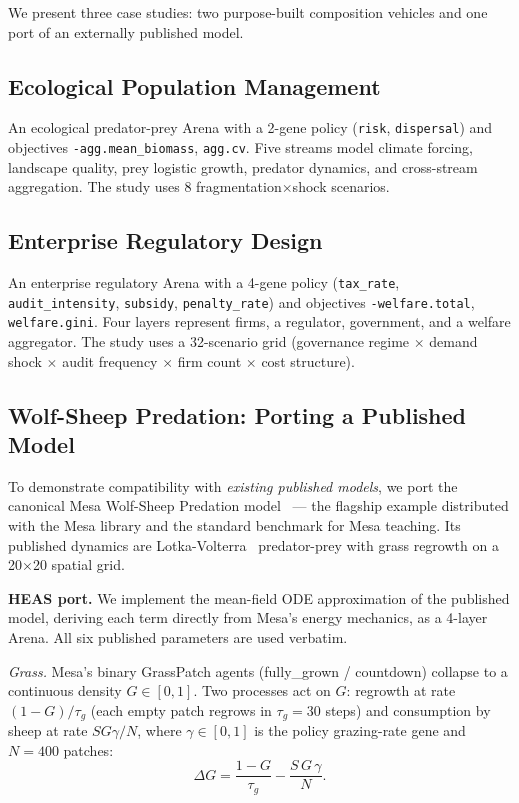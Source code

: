 \documentclass{wscpaperproc}
\begin{document}
We present three case studies: two purpose-built composition vehicles and
one port of an externally published model.

\subsection{Ecological Population Management}

An ecological predator-prey Arena with a 2-gene policy (\texttt{risk},
\texttt{dispersal}) and objectives \texttt{-agg.mean\_biomass},
\texttt{agg.cv}. Five streams model climate forcing, landscape quality, prey
logistic growth, predator dynamics, and cross-stream aggregation. The study
uses 8 fragmentation$\times$shock scenarios.

\subsection{Enterprise Regulatory Design}

An enterprise regulatory Arena with a 4-gene policy
(\texttt{tax\_rate}, \texttt{audit\_intensity}, \texttt{subsidy},
\texttt{penalty\_rate}) and objectives \texttt{-welfare.total},
\texttt{welfare.gini}. Four layers represent firms, a regulator, government,
and a welfare aggregator. The study uses a 32-scenario grid (governance
regime $\times$ demand shock $\times$ audit frequency $\times$ firm count
$\times$ cost structure).

\subsection{Wolf-Sheep Predation: Porting a Published Model}
\label{sec:wolfsheep}

To demonstrate compatibility with \emph{existing published models}, we port
the canonical Mesa Wolf-Sheep Predation model~\cite{wilensky1997wolfsheep,
kazil2020mesa} --- the flagship example distributed with the Mesa library
and the standard benchmark for Mesa teaching. Its published dynamics are
Lotka-Volterra~\cite{lotka1925elements,volterra1926variazioni}
predator-prey with grass regrowth on a 20$\times$20 spatial grid.

\textbf{HEAS port.} We implement the mean-field ODE approximation of the
published model, deriving each term directly from Mesa's energy mechanics,
as a 4-layer Arena. All six published parameters are used verbatim.

\textit{Grass.} Mesa's binary GrassPatch agents (fully\_grown / countdown)
collapse to a continuous density $G\in[0,1]$. Two processes act on $G$:
regrowth at rate $(1-G)/\tau_g$ (each empty patch regrows in
$\tau_g=30$ steps) and consumption by sheep at rate $SG\gamma/N$, where
$\gamma\in[0,1]$ is the policy grazing-rate gene and $N=400$ patches:
\begin{equation}
  \Delta G = \frac{1-G}{\tau_g} - \frac{S\,G\,\gamma}{N}.
  \label{eq:grass}
\end{equation}
\end{document}
